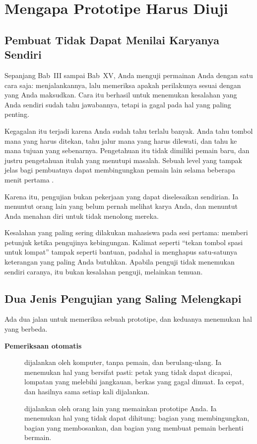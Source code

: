 \section{Mengapa Prototipe Harus Diuji}
\label{sec:mengapa-diuji}

\subsection{Pembuat Tidak Dapat Menilai Karyanya Sendiri}

Sepanjang Bab~III sampai Bab~XV, Anda menguji permainan Anda dengan satu cara
saja: menjalankannya, lalu memeriksa apakah perilakunya sesuai dengan yang Anda
maksudkan. Cara itu berhasil untuk menemukan kesalahan yang Anda sendiri sudah
tahu jawabannya, tetapi ia gagal pada hal yang paling penting.

Kegagalan itu terjadi karena Anda sudah tahu terlalu banyak. Anda tahu tombol
mana yang harus ditekan, tahu jalur mana yang harus dilewati, dan tahu ke mana
tujuan yang sebenarnya. Pengetahuan itu tidak dimiliki pemain baru, dan justru
pengetahuan itulah yang menutupi masalah. Sebuah level yang tampak jelas bagi
pembuatnya dapat membingungkan pemain lain selama beberapa menit pertama
\cite{unity-leveldesign}.

Karena itu, pengujian bukan pekerjaan yang dapat diselesaikan sendirian. Ia
menuntut orang lain yang belum pernah melihat karya Anda, dan menuntut Anda
menahan diri untuk tidak menolong mereka.

\begin{peringatanbox}
Kesalahan yang paling sering dilakukan mahasiswa pada sesi
 pertama: memberi petunjuk ketika pengujinya kebingungan.
Kalimat seperti ``tekan tombol spasi untuk lompat'' tampak seperti bantuan,
padahal ia menghapus satu-satunya keterangan yang paling Anda butuhkan.
Apabila penguji tidak menemukan sendiri caranya, itu bukan kesalahan penguji,
melainkan temuan.
\end{peringatanbox}

\subsection{Dua Jenis Pengujian yang Saling Melengkapi}

Ada dua jalan untuk memeriksa sebuah prototipe, dan keduanya menemukan hal yang
berbeda.

\begin{description}
  \item[\textbf{Pemeriksaan otomatis}] dijalankan oleh komputer, tanpa pemain,
        dan berulang-ulang. Ia menemukan hal yang bersifat pasti: petak yang
        tidak dapat dicapai, lompatan yang melebihi jangkauan, berkas yang
        gagal dimuat. Ia cepat, dan hasilnya sama setiap kali dijalankan.
  \item[\textbf{}] dijalankan oleh orang lain yang memainkan
        prototipe Anda. Ia menemukan hal yang tidak dapat dihitung: bagian yang
        membingungkan, bagian yang membosankan, dan bagian yang membuat pemain
        berhenti bermain.
\end{description}

